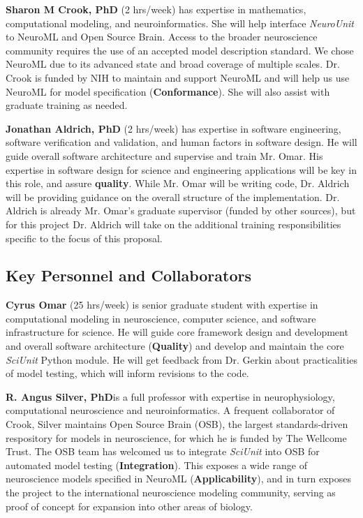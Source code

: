 \documentclass[11pt,letterpaper]{article}
\begin{document}
\textbf{Sharon M Crook, PhD} (2 hrs/week) has expertise in mathematics, computational modeling, and neuroinformatics.  She will help interface \textit{NeuroUnit} to NeuroML and Open Source Brain. Access to the broader neuroscience community requires the use of an accepted model description standard.  We chose NeuroML due to its advanced state and broad coverage of multiple scales.  Dr. Crook is funded by NIH to maintain and support NeuroML and will help us use NeuroML for model specification (\textbf{Conformance}).  She will also assist with graduate training as needed.  

\textbf{Jonathan Aldrich, PhD} (2 hrs/week) has expertise in software engineering, software verification and validation, and human factors in software design. He will guide overall software architecture and supervise and train Mr. Omar.  His expertise in software design for science and engineering applications will be key in this role, and assure \textbf{quality}.  While Mr. Omar will be writing code, Dr. Aldrich will be providing guidance on the overall structure of the implementation.  Dr. Aldrich is already Mr. Omar's graduate supervisor (funded by other sources), but for this project Dr. Aldrich will take on the additional training responsibilities specific to the focus of this proposal.  

\subsection{Key Personnel and Collaborators}
\textbf{Cyrus Omar} (25 hrs/week) is senior graduate student with expertise in computational modeling in neuroscience, computer science, and software infrastructure for science.  He will guide core framework design and development and overall software architecture (\textbf{Quality}) and develop and maintain the core \textit{SciUnit} Python module.  He will get feedback from Dr. Gerkin about practicalities of model testing, which will inform revisions to the code.  

\textbf{R. Angus Silver, PhD}is a full professor with expertise in neurophysiology, computational neuroscience and neuroinformatics.  A frequent collaborator of Crook, Silver maintains Open Source Brain (OSB), the largest standards-driven respository for models in neuroscience, for which he is funded by The Wellcome Trust.  The OSB team has welcomed us to integrate \textit{SciUnit} into OSB for automated model testing (\textbf{Integration}).  This exposes a wide range of neuroscience models specified in NeuroML (\textbf{Applicability}), and in turn exposes the project to the international neuroscience modeling community, serving as proof of concept for expansion into other areas of biology.  
\end{document}
